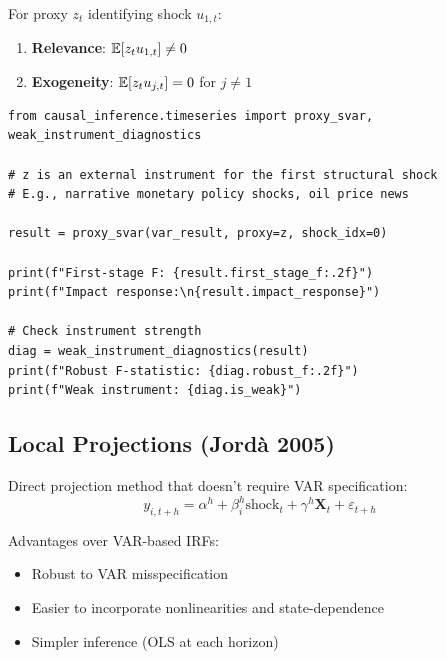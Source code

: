 \begin{assumption}
For proxy $z_t$ identifying shock $u_{1,t}$:
\begin{enumerate}
    \item \textbf{Relevance}: $\mathbb{E}[z_t u_{1,t}] \neq 0$
    \item \textbf{Exogeneity}: $\mathbb{E}[z_t u_{j,t}] = 0$ for $j \neq 1$
\end{enumerate}
\end{assumption}

\begin{verbatim}
from causal_inference.timeseries import proxy_svar, weak_instrument_diagnostics

# z is an external instrument for the first structural shock
# E.g., narrative monetary policy shocks, oil price news

result = proxy_svar(var_result, proxy=z, shock_idx=0)

print(f"First-stage F: {result.first_stage_f:.2f}")
print(f"Impact response:\n{result.impact_response}")

# Check instrument strength
diag = weak_instrument_diagnostics(result)
print(f"Robust F-statistic: {diag.robust_f:.2f}")
print(f"Weak instrument: {diag.is_weak}")
\end{verbatim}

\subsection{Local Projections (Jord\`{a} 2005)}

Direct projection method that doesn't require VAR specification:
\begin{equation}
y_{i,t+h} = \alpha^h + \beta^h_i \text{shock}_t + \gamma^h \mathbf{X}_t + \varepsilon_{t+h}
\label{eq:local-projection}
\end{equation}

Advantages over VAR-based IRFs:
\begin{itemize}
    \item Robust to VAR misspecification
    \item Easier to incorporate nonlinearities and state-dependence
    \item Simpler inference (OLS at each horizon)
\end{itemize}


